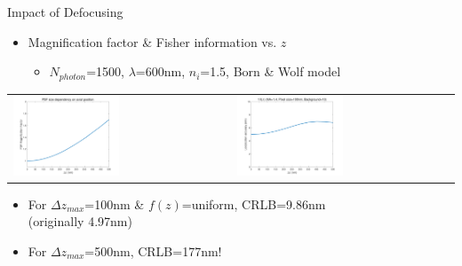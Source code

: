 \documentclass[t]{beamer}
\begin{document}
\begin{frame}{
    Impact of Defocusing 
}
    \begin{itemize}
        \item   Magnification factor \& Fisher information vs. $z$
    \begin{itemize}
        \item    $N_{photon}$=1500, $\lambda$=600nm, $n_i$=1.5, Born \& Wolf model
    \end{itemize}
    \end{itemize}
    \vspace{-1em}
    \centering
    \begin{tabular}{C{0.45\textwidth} C{0.45\textwidth}}
        \includegraphics[width=0.5\textwidth]{SaveFilemag} &
        \includegraphics[width=0.5\textwidth]{SaveFilez} \\
    \end{tabular}
    \begin{itemize}
        \item For $\Delta z_{max}$=100nm \& $f(z)$=uniform, CRLB=9.86nm \\(originally 4.97nm)
        \item For $\Delta z_{max}$=500nm, CRLB=177nm!
    \end{itemize}
\end{frame}
\end{document}
